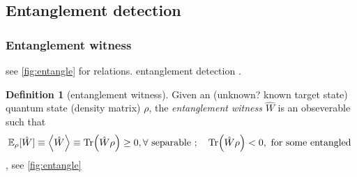\documentclass[
10pt,
aps,
pra,
linenumbers,
floatfix,
]{revtex4-2}
\theoremstyle{plain}
\theoremstyle{definition}
\newtheorem{definition}{Definition}
\newcommand{\ew}{\hat{W}}
\newcommand{\dm}{\rho}
\begin{document}
\subsection{Entanglement detection}
\subsubsection{Entanglement witness}\label{sec:entanglement_witness}

see \cref{fig:entangle} for relations.
entanglement detection \cite{guhneEntanglementDetection2009}.
\begin{definition}[entanglement witness]\label{def:entanglement_witness}
	Given an (unknown? known target state) quantum state (density matrix) $\dm$, the \emph{entanglement witness} $\ew$ is an obseverable such that
	\begin{equation}
		\expectation_{\dm}[\ew]\equiv\expval{\ew}\equiv
		\Tr(\ew\dm) \ge 0 , \forall \text{ separable };\quad
		\Tr(\ew\dm) < 0 , \text{ for some entangled }
	\end{equation}
	\cite{terhalBellInequalitiesSeparability2000}, see \cref{fig:entangle}
\end{definition}
\end{document}
